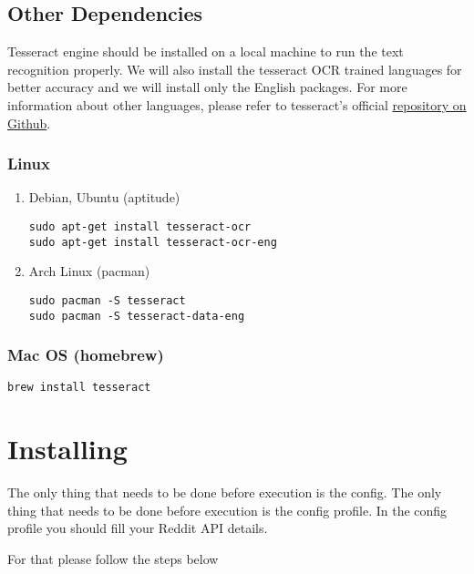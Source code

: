 \documentclass[11pt]{article}
\begin{document}
\subsection{Other Dependencies}
\label{sec-1-2}

Tesseract engine should be installed on a local machine to run the text
recognition properly. We will also install the tesseract OCR trained 
languages for better accuracy and we will install only the English 
packages. For more information about other languages, please refer to 
tesseract's official 
\href{https://github.com/tesseract-ocr/tesseract}{repository on Github}.

\subsubsection{Linux}
\label{sec-1-2-1}

\begin{enumerate}
\item Debian, Ubuntu (aptitude)
\label{sec-1-2-1-1}

\begin{verbatim}
sudo apt-get install tesseract-ocr
sudo apt-get install tesseract-ocr-eng
\end{verbatim}

\item Arch Linux (pacman)
\label{sec-1-2-1-2}

\begin{verbatim}
sudo pacman -S tesseract
sudo pacman -S tesseract-data-eng
\end{verbatim}
\end{enumerate}

\subsubsection{Mac OS (homebrew)}
\label{sec-1-2-2}
\begin{verbatim}
brew install tesseract
\end{verbatim}

\section{Installing}
\label{sec-2}

The only thing that needs to be done before execution is the config. The only
thing that needs to be done before execution is the config profile. In the
config profile you should fill your Reddit API details.

For that please follow the steps below
\end{document}
